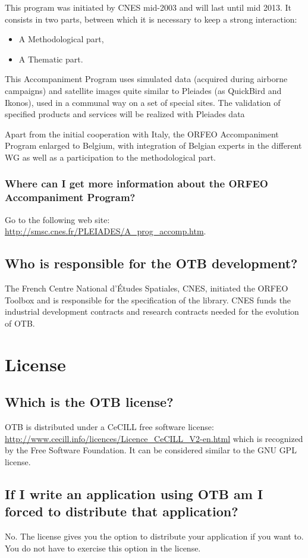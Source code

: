 This program was initiated by CNES mid-2003 and will last until mid 2013.
It consists in two parts, between which it is necessary to keep a strong interaction:
\begin{itemize}
\item A Methodological part,
\item A Thematic part.
\end{itemize}

This Accompaniment Program uses simulated data (acquired during airborne campaigns) and satellite images quite similar to Pleiades (as QuickBird and Ikonos), used in a communal way on a set of special sites. The validation of specified products and services will be realized with Pleiades data

Apart from the initial cooperation with Italy, the ORFEO Accompaniment
Program enlarged to Belgium, with integration of Belgian experts in
the different WG as well as a participation to the methodological
part.

\subsubsection{Where can I get more information about the ORFEO
  Accompaniment Program?}
Go to the following web site:
\url{http://smsc.cnes.fr/PLEIADES/A_prog_accomp.htm}.

\subsection{Who is responsible for the OTB development?}
The French Centre National d'\'Etudes Spatiales, CNES, initiated the ORFEO
Toolbox and is responsible for the specification of the library. CNES
funds the industrial development contracts and research contracts
needed for the evolution of OTB.

\section{License}
\subsection{Which is the OTB license?}
OTB is distributed under a CeCILL free software license:\\
\url{http://www.cecill.info/licences/Licence_CeCILL_V2-en.html} which 
is recognized by the Free Software Foundation. It can be considered 
similar to the GNU GPL license. 

\subsection{If I write an application using OTB am I forced to distribute that application?}
No. The license gives you the option to distribute your application if
you want to. You do not have to exercise this option in the license.

